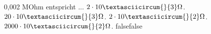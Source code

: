     {0,002 MOhm entspricht ...}
    {$2\cdot 10\textasciicircum{}\{3\} \Omega$.}
    {$20\cdot 10\textasciicircum{}\{3\} \Omega$.}
    {$2\cdot 10\textasciicircum{}\{2\} \Omega$.}
    {$2000\cdot 10\textasciicircum{}\{2\} \Omega$.}
    {false}{false}